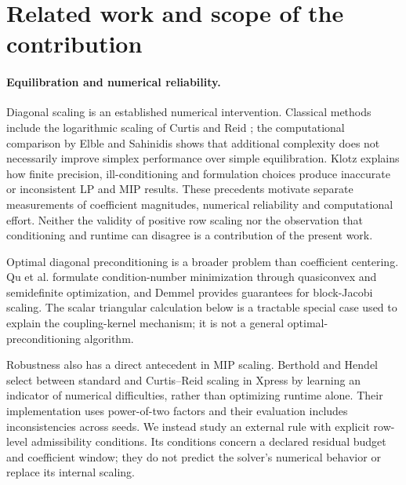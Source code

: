\section{Related work and scope of the contribution}
\label{sec:related}

\paragraph{Equilibration and numerical reliability.}
Diagonal scaling is an established numerical intervention. Classical methods include
the logarithmic scaling of Curtis and Reid \cite{curtis1972scaling}; the computational
comparison by Elble and Sahinidis \cite{elble2012scaling} shows that additional
complexity does not necessarily improve simplex performance over simple
equilibration. Klotz \cite{klotz2014numerics} explains how finite precision,
ill-conditioning and formulation choices produce inaccurate or inconsistent LP and
MIP results. These precedents motivate separate measurements of coefficient
magnitudes, numerical reliability and computational effort. Neither the validity of
positive row scaling nor the observation that conditioning and runtime can disagree
is a contribution of the present work.

Optimal diagonal preconditioning is a broader problem than coefficient centering.
Qu et al. \cite{qu2024diagonal} formulate condition-number minimization through
quasiconvex and semidefinite optimization, and Demmel \cite{demmel2023block}
provides guarantees for block-Jacobi scaling. The scalar triangular calculation
below is a tractable special case used to explain the coupling-kernel mechanism;
it is not a general optimal-preconditioning algorithm.

Robustness also has a direct antecedent in MIP scaling. Berthold and Hendel
\cite{berthold2021scaling} select between standard and Curtis--Reid scaling in
Xpress by learning an indicator of numerical difficulties, rather than optimizing
runtime alone. Their implementation uses power-of-two factors and their evaluation
includes inconsistencies across seeds. We instead study an external rule with explicit
row-level admissibility conditions. Its conditions concern a declared residual budget
and coefficient window; they do not predict the solver's numerical behavior or
replace its internal scaling.

